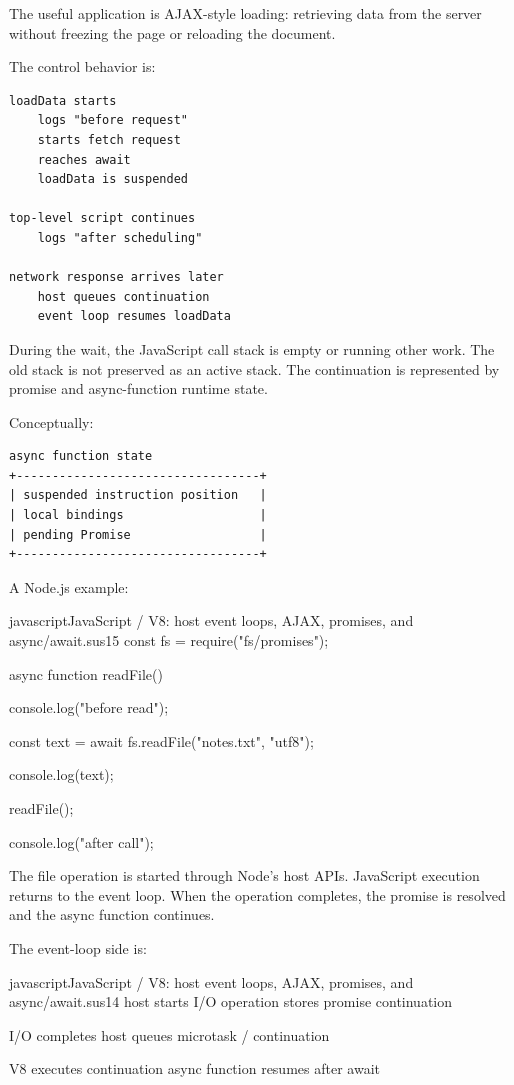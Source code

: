 The useful application is AJAX-style loading: retrieving data from the server without freezing the page or reloading the document.

The control behavior is:

\begin{verbatim}
loadData starts
    logs "before request"
    starts fetch request
    reaches await
    loadData is suspended

top-level script continues
    logs "after scheduling"

network response arrives later
    host queues continuation
    event loop resumes loadData
\end{verbatim}

During the wait, the JavaScript call stack is empty or running other work. The old stack is not preserved as an active stack. The continuation is represented by promise and async-function runtime state.

Conceptually:

\begin{verbatim}
async function state
+----------------------------------+
| suspended instruction position   |
| local bindings                   |
| pending Promise                  |
+----------------------------------+
\end{verbatim}

A Node.js example:

\begin{codebox}[]{javascript}{JavaScript / V8: host event loops, AJAX, promises, and async/await.}{sus15}
const fs = require("fs/promises");

async function readFile() {
    console.log("before read");

    const text = await fs.readFile("notes.txt", "utf8");

    console.log(text);
}

readFile();

console.log("after call");
\end{codebox}


The file operation is started through Node's host APIs. JavaScript execution returns to the event loop. When the operation completes, the promise is resolved and the async function continues.

The event-loop side is:

\begin{codebox}[]{javascript}{JavaScript / V8: host event loops, AJAX, promises, and async/await.}{sus14}
host starts I/O operation
    stores promise continuation

I/O completes
    host queues microtask / continuation

V8 executes continuation
    async function resumes after await
\end{codebox}



